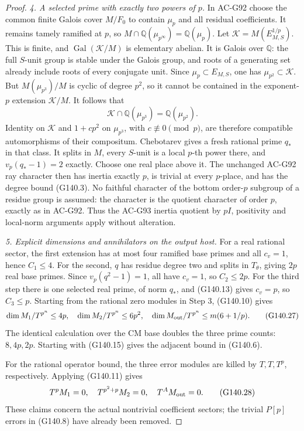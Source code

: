 \begin{proof}
\emph{4. A selected prime with exactly two powers of $p$.}
In AC-G92 choose the common finite Galois cover $M/F_0$ to
contain $\mu_p$ and all residual coefficients.  It remains
tamely ramified at $p$, so
$M\cap\mathbb Q(\mu_{p^\infty})=\mathbb Q(\mu_p)$.
Let $\mathcal K=M(E_{M,S}^{1/p})$.  This is finite, and
$\operatorname{Gal}(\mathcal K/M)$ is elementary abelian.
It is Galois over $\mathbb Q$: the full $S$-unit group is
stable under the Galois group, and roots of a generating set
already include roots of every conjugate unit.
Since $\mu_p\subset E_{M,S}$, one has $\mu_{p^2}\subset\mathcal K$.
But $M(\mu_{p^3})/M$ is cyclic of degree $p^2$, so it cannot
be contained in the exponent-$p$ extension $\mathcal K/M$.
It follows that
\[
 \mathcal K\cap\mathbb Q(\mu_{p^3})=\mathbb Q(\mu_{p^2}).
 \tag{G140.26}
\]
Identity on $\mathcal K$ and $1+cp^2$ on $\mu_{p^3}$, with
$c\not\equiv0\pmod p$, are therefore compatible automorphisms
of their compositum.  Chebotarev gives a fresh rational prime
$q_*$ in that class.  It splits in $M$, every $S$-unit is a
local $p$-th power there, and $v_p(q_*-1)=2$ exactly.
Choose one real place above it.  The unchanged AC-G92 ray
character then has inertia exactly $p$, is trivial at every
$p$-place, and has the degree bound (G140.3).
No faithful character of the bottom order-$p$ subgroup of a
residue group is assumed: the character is the quotient
character of order $p$, exactly as in AC-G92.  Thus the
AC-G93 inertia quotient by $pI$, positivity and local-norm
arguments apply without alteration.

\emph{5. Explicit dimensions and annihilators on the output host.}
For a real rational sector, the first extension has at most four
ramified base primes and all $c_v=1$, hence $C_1\le4$.
For the second, $q$ has residue degree two and splits in
$T_\theta$, giving $2p$ real base primes.  Since
$v_p(q^2-1)=1$, all have $c_v=1$, so $C_2\le2p$.
For the third step there is one selected real prime, of norm
$q_*$, and (G140.13) gives $c_v=p$, so $C_3\le p$.
Starting from the rational zero modules in Step 3, (G140.10) gives
\[
 \dim M_1/T^{p^n}\le4p,\quad
 \dim M_2/T^{p^n}\le6p^2,\quad
 \dim M_{\rm out}/T^{p^n}\le m(6+1/p).
 \tag{G140.27}
\]
The identical calculation over the CM base doubles the three
prime counts: $8,4p,2p$.  Starting with (G140.15) gives the
adjacent bound in (G140.6).

For the rational operator bound, the three error modules are
killed by $T,T,T^p$, respectively.  Applying (G140.11) gives
\[
       T^pM_1=0,\quad T^{p^2+p}M_2=0,\quad T^AM_{\rm out}=0.
 \tag{G140.28}
\]
These claims concern the actual nontrivial coefficient sectors;
the trivial $P[p]$ errors in (G140.8) have already been removed.


\end{proof}
